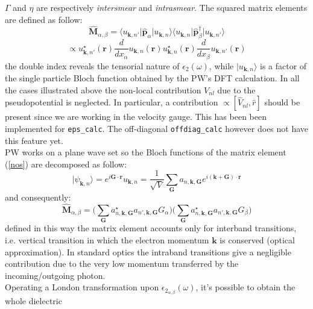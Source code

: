 \documentclass[twocolumn]{article}
\begin{document}
$\Gamma$ and $\eta$ are respectively \emph{intersmear} and \emph{intrasmear}. 
The squared matrix elements are defined as follow:
\begin{equation}
\hat{\textbf{M}}_{\alpha,\beta}=\langle u_{\textbf{k},n'}\vert\hat{\textbf{p}}_{\alpha}\vert u_{\textbf{k},n}\rangle
\langle u_{\textbf{k},n}\vert\hat{\textbf{p}}_{\beta}^{\dagger}\vert u_{\textbf{k},n'}\rangle
\label{nos}
\end{equation}
\begin{equation}
\propto u_{\textbf{k},n'}^{\star}(\textbf{r})\frac{d}{d x_{\alpha}}u_{\textbf{k},n}(\textbf{r})
u_{\textbf{k},n}^{\star}(\textbf{r})\frac{d}{d x_{\beta}}u_{\textbf{k},n'}(\textbf{r})
\end{equation}
the double index reveals the tensorial nature of $\epsilon_{2}(\omega)$, while $\vert u_{\textbf{k},n}\rangle$ is a
factor of the single particle Bloch function obtained by the PW's DFT calculation.
In all the cases illustrated above the non-local contribution $V_{nl}$ due to the pseudopotential is neglected. In particular,
a contribution $\propto [\hat V_{nl},\hat r]$ should be present since we are working in the velocity gauge. This has been
been implemented for \texttt{eps_calc}. The off-diagonal \texttt{offdiag_calc} however does not have this feature yet.\\
PW works on a plane wave set so the Bloch functions of the matrix element (\ref{nos}) are decomposed as follow:
\begin{equation}
\vert \psi_{\textbf{k},n}\rangle=e^{i\textbf{G}\cdot\textbf{r}}u_{\textbf{k},n}=\frac{1}{\sqrt{V}}\sum_{\textbf{G}}a_{n,\textbf{k},\textbf{G}}
e^{i(\textbf{k}+\textbf{G})\cdot\textbf{r}}
\end{equation}
and consequently:
\begin{equation}
\hat{\textbf{M}}_{\alpha,\beta}=\bigg(\sum_{\textbf{G}}a^{\star}_{n,\textbf{k},\textbf{G}}a_{n',\textbf{k},\textbf{G}}
G_{\alpha}\bigg) \bigg(\sum_{\textbf{G}}a^{\star}_{n,\textbf{k},\textbf{G}}a_{n',\textbf{k},\textbf{G}}
G_{\beta}\bigg)
\end{equation}
defined in this way the matrix element accounts only for interband transitions, i.e. vertical transition in which the
electron momentum $\textbf{k}$ is conserved (optical approximation). In standard optics the intraband transitions give a 
negligible contribution due to the very low momentum transferred by the incoming/outgoing photon.\\
Operating a London transformation upon $\epsilon_{2_{\alpha,\beta}}(\omega)$, it's possible to obtain the whole dielectric
\end{document}
